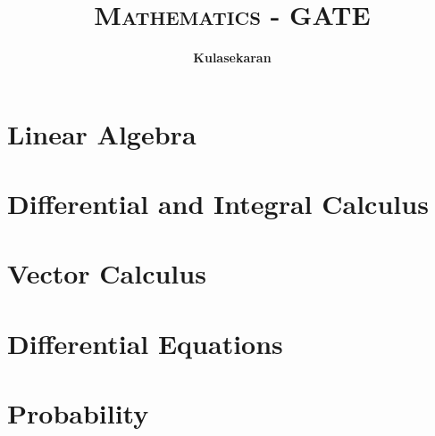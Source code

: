 \documentclass[8pt]{report}
\title{\Huge{\textsc{Mathematics - GATE}}}
\author{\huge{\textbf{Kulasekaran}}}
\begin{document}
\maketitle
\tableofcontents
\chapter{Linear Algebra}
\chapter{Differential and Integral Calculus}
\chapter{Vector Calculus}
\chapter{Differential Equations}
\chapter{Probability}
\end{document}
